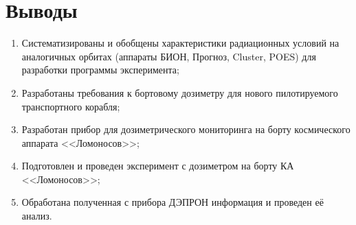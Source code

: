 \section{Выводы}
\begin{enumerate}
	\item Систематизированы и обобщены характеристики радиационных условий на аналогичных орбитах (аппараты БИОН, Прогноз, Cluster, POES) для разработки программы эксперимента;
	\item Разработаны требования к бортовому дозиметру для нового пилотируемого транспортного корабля;
	\item Разработан прибор для дозиметрического мониторинга на борту космического аппарата <<Ломоносов>>;
	\item Подготовлен и проведен эксперимент с дозиметром на борту КА <<Ломоносов>>;
	\item Обработана полученная с прибора ДЭПРОН информация и проведен её анализ.	
\end{enumerate}
